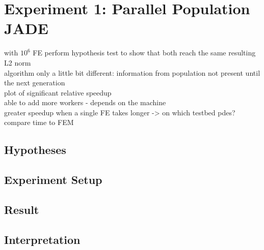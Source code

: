 \documentclass[./\jobname.tex]{subfiles}
\begin{document}
\chapter {Experiment 1: Parallel Population JADE}
\label{chap:experimet_1}

with $10^6$ FE
perform hypothesis test to show that both reach the same resulting L2 norm\\
algorithm only a little bit different: information from population not present until the next generation \\
plot of significant relative speedup \\
able to add more workers - depends on the machine \\
greater speedup when a single FE takes longer -> on which testbed pdes? 
compare time to FEM \\

\section{Hypotheses}

\section{Experiment Setup}

\section{Result}

\section{Interpretation}
\end{document}
